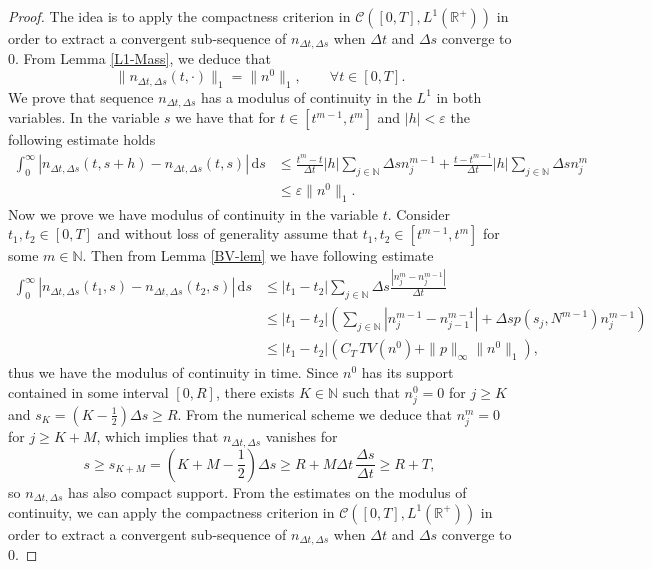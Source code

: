 \documentclass[11pt,a4paper]{article}
\newcommand{\R}{\mathbb{R}}
\newcommand{\N}{\mathbb{N}}
\newcommand{\dd}{\mathrm{d}}
\begin{document}
\begin{proof}
  The idea is to apply the compactness criterion in $\mathcal{C}([0,T],L^1(\R^+))$ in order to extract a convergent sub-sequence of $n_{\Delta t,\Delta s}$ when $\Delta t$ and $\Delta s$ converge to $0$. From Lemma \ref{L1-Mass}, we deduce that
 \begin{equation*}
  \|n_{\Delta t,\Delta s}(t,\cdot)\|_1 = \|n^0\|_1,\qquad\forall t\in[0,T].
   \end{equation*}
We prove that sequence $n_{\Delta t,\Delta s}$ has a modulus of continuity in the $L^1$ in both variables. In the variable $s$ we have that for $t\in[t^{m-1},t^m]$ and $|h|<\varepsilon$ the following estimate holds
 \begin{equation*}
    \begin{split}
        \int_0^\infty|n_{\Delta t,\Delta s}(t,s+h)-n_{\Delta t,\Delta s}(t,s)|\,\dd s&\le \frac{t^m-t}{\Delta t}|h|\sum_{j\in\N}\Delta s n_j^{m-1}+\frac{t-t^{m-1}}{\Delta t}|h|\sum_{j\in\N}\Delta s n_j^m\\
        &\le \varepsilon\|n^0\|_1.
    \end{split}
\end{equation*}
Now we prove we have modulus of continuity in the variable $t$. Consider $t_1,t_2\in [0,T]$ and without loss of generality assume that $t_1,t_2\in [t^{m-1},t^{m}]$ for some $m\in\N$. Then from Lemma \ref{BV-lem} we have following estimate
    \begin{equation}
    \label{mod-cont-t}
    \begin{split}
        \int_0^\infty|n_{\Delta t,\Delta s}(t_1,s)-n_{\Delta t,\Delta s}(t_2,s)|\,\dd s&\le |t_1-t_2|\sum_{j\in\N}\Delta s \frac{|n^{m}_j-n^{m-1}_j|}{\Delta t}\\
        &\le |t_1-t_2|\left(\sum_{j\in\N} |n^{m-1}_j-n^{m-1}_{j-1}| +\Delta s p(s_j,N^{m-1})n^{m-1}_j\right) \\
        &\le |t_1-t_2|\left(C_T\,TV(n^0)+\|p\|_\infty\|n^0\|_1\right),
    \end{split}  
    \end{equation}
    thus we have the modulus of continuity in time. Since $n^0$ has its support contained in some interval $[0,R]$, there exists $K\in\N$ such that $n^0_j=0$ for $j\ge K$ and $s_K=(K-\frac{1}{2})\Delta s\ge R$. From the numerical scheme we deduce that $n^m_j=0$ for $j\ge K+M$, which implies that $n_{\Delta t,\Delta s}$ vanishes for 
    \begin{equation*}
    s\ge s_{K+M}=(K+M-\frac{1}{2})\Delta s\ge R+M\Delta{t}\,\frac{\Delta s}{\Delta t}\ge R+T,
    \end{equation*}
    so $n_{\Delta t,\Delta s}$ has also compact support. From the estimates on the modulus of continuity, we can apply the compactness criterion in $\mathcal{C}([0,T],L^1(\R^+))$ in order to extract a convergent sub-sequence of $n_{\Delta t,\Delta s}$ when $\Delta t$ and $\Delta s$ converge to $0$.
    

\end{proof}
\end{document}
